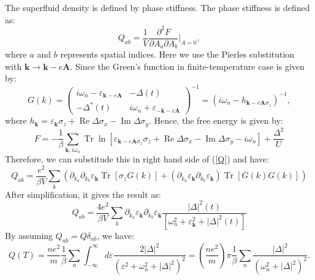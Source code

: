 \documentclass{article}
\newcommand{\nobracket}{}
\newcommand{\tmmathbf}[1]{\ensuremath{\boldsymbol{#1}}}
\newcommand{\tmop}[1]{\ensuremath{\operatorname{#1}}}
\begin{document}
The superfluid density is defined by phase stiffness. The phase stiffness is
defined as:
\begin{equation}
  Q_{a b} = \frac{1}{V} \frac{\partial^2 F}{\partial A_a \partial A_b} |_{A =
  0} \nobracket, \label{Q}
\end{equation}
where $a$ and $b$ represents spatial indices. Here we use the Pierles
substitution with $\tmmathbf{k} \rightarrow \tmmathbf{k}- e\tmmathbf{A}$.
Since the Green's function in finite-temperature case is given by:
\begin{equation}
  G (k) = \left(\begin{array}{cc}
    i \omega_n - \varepsilon_{\tmmathbf{k}- e\tmmathbf{A}} & - \Delta (t)\\
    - \Delta^{\ast} (t) & i \omega_n + \varepsilon_{-\tmmathbf{k}-
    e\tmmathbf{A}}
  \end{array}\right)^{- 1} = (i \omega_n - h_{\tmmathbf{k}- e\tmmathbf{A}
  \sigma_z})^{- 1},
\end{equation}
where $h_{\tmmathbf{k}} = \varepsilon_{\tmmathbf{k}}
\sigma_z + \tmop{Re} \Delta \sigma_x - \tmop{Im} \Delta \sigma_y$. Hence, the
free energy is given by:
\begin{equation}
  F = - \frac{1}{\beta} \sum_{\tmmathbf{k}, i \omega_n} \tmop{Tr} \ln
  [\varepsilon_{\tmmathbf{k}- e\tmmathbf{A} \sigma_z} \sigma_z + \tmop{Re}
  \Delta \sigma_x - \tmop{Im} \Delta \sigma_y - i \omega_n] +
  \frac{\Delta^2}{U}
\end{equation}
Therefore, we can substitude this in right hand side of (\ref{Q}) and have:
\begin{equation}
  Q_{a b} = \frac{e^2}{\beta V} \sum_k (\partial_{k_a} \partial_{k_b}
  \varepsilon_{\tmmathbf{k}} \tmop{Tr} [\sigma_z G (k)] + (\partial_{k_a}
  \varepsilon_{\tmmathbf{k}} \partial_{k_b} \varepsilon_{\tmmathbf{k}})
  \tmop{Tr} [G (k) G (k)])
\end{equation}
After simplification, it gives the result as:
\begin{equation}
  Q_{a b} = \frac{4 e^2}{\beta V} \sum_k \partial_{k_a}
  \varepsilon_{\tmmathbf{k}} \partial_{k_b} \varepsilon_{\tmmathbf{k}} \frac{|
  \Delta |^2 (t)}{[\omega_n^2 + \varepsilon_{\tmmathbf{k}}^2 + | \Delta |^2
  (t)]}
\end{equation}
By assuming $Q_{a b} = Q \delta_{a b}$, we have:
\begin{equation}
  Q (T) = \frac{n e^2}{m} \frac{1}{\beta} \sum_n \int_{- \infty}^{\infty} d
  \varepsilon \frac{2 | \Delta |^2}{(\varepsilon^2 + \omega_n^2 + | \Delta
  |^2)^2} = \left( \frac{n e^2}{m} \right) \pi \frac{1}{\beta} \sum_n \frac{|
  \Delta |^2}{(\omega_n^2 + | \Delta |^2)^2}.
\end{equation}
\end{document}
